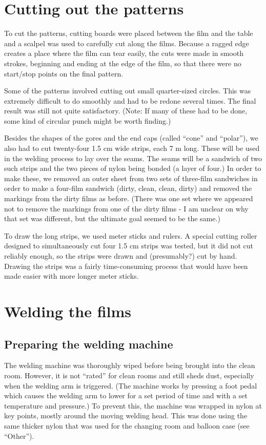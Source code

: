 \documentclass{article}
\begin{document}
\section{Cutting out the patterns}
To cut the patterns, cutting boards were placed between the film and the table and a scalpel was used to carefully cut along the films. Because a ragged edge creates a place where the film can tear easily, the cuts were made in smooth strokes, beginning and ending at the edge of the film, so that there were no start/stop points on the final pattern. %

Some of the patterns involved cutting out small quarter-sized circles. This was extremely difficult to do smoothly and had to be redone several times. The final result was still not quite satisfactory. (Note: If many of these had to be done, some kind of circular punch might be worth finding.) 

Besides the shapes of the gores and the end caps (called ``cone'' and ``polar''), we also had to cut twenty-four 1.5 cm wide strips, each 7 m long. These will be used in the welding process to lay over the seams. The seams will be a sandwich of two such strips and the two pieces of nylon being bonded (a layer of four.) 
In order to make these, we removed an outer sheet from two sets of three-film sandwiches in order to make a four-film sandwich (dirty, clean, clean, dirty) and removed the markings from the dirty films as before.  (There was one set where we appeared not to remove the markings from one of the dirty films - I am unclear on why that set was different, but the ultimate goal seemed to be the same.) 

To draw the long strips, we used meter sticks and rulers. A special cutting roller designed to simultaneously cut four 1.5 cm strips was tested, but it did not cut reliably enough, so the strips were drawn and (presumably?) cut by hand.  Drawing the strips was a fairly time-consuming process that would have been made easier with more longer meter sticks. 

\section{Welding the films} 
\subsection{Preparing the welding machine}
The welding machine was thoroughly wiped before being brought into the clean room. However, it is not ``rated'' for clean rooms and still sheds dust, especially when the welding arm is triggered. (The machine works by pressing a foot pedal which causes the welding arm to lower for a set period of time and with a set temperature and pressure.) To prevent this, the machine was wrapped in nylon at key points, mostly around the moving welding head.  This was done using the same thicker nylon that was used for the changing room and balloon case (see ``Other''). 
\end{document}
